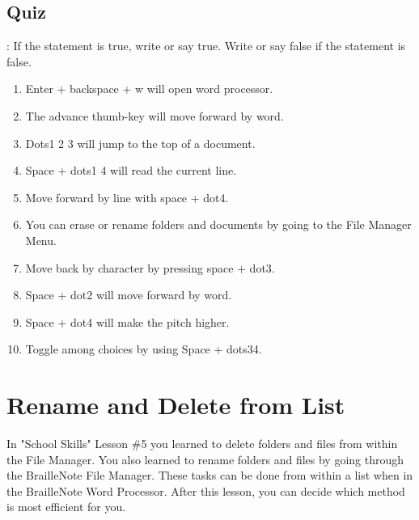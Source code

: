 \documentclass[10pt,letterpaper,twoside]{report}
\begin{document}
{\subsection{Quiz}:
If the statement is true, write or say true. Write or say false if the statement is false.
\begin{enumerate}
	\item Enter + backspace + w will open word processor.
	\item The advance thumb-key will move forward by word.
	\item Dots1 2 3 will jump to the top of a document.
	\item Space + dots1 4 will read the current line.
	\item Move forward by line with space + dot4.
	\item You can erase or rename folders and documents by going to the File Manager Menu.
	\item Move back by character by pressing space + dot3.
	\item Space + dot2 will move forward by word.
	\item Space + dot4 will make the pitch higher.
	\item Toggle among choices by using Space + dots34.
\end{enumerate}

\clearpage
\section{Rename and Delete from List}
In "School Skills" Lesson \#5 you learned to delete folders and files from within the File Manager. You also learned to rename folders and files by going through the BrailleNote File Manager. These tasks can be done from within a list when in the BrailleNote Word Processor. After this lesson, you can decide which method is most efficient for you.
}
\end{document}

